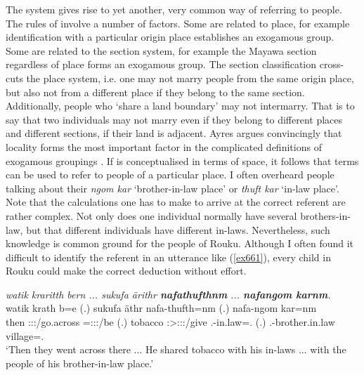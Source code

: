 The  system gives rise to yet another, very common way of referring to people. The rules of  involve a number of factors. Some are related to place, for example identification with a particular origin place establishes an exogamous group. Some are related to the section system, for example the Mayawa section regardless of place forms an exogamous group. The section classification cross-cuts the place system, i.e. one may not marry people from the same origin place, but also not from a different place if they belong to the same section. Additionally, people who `share a land boundary' may not intermarry. That is to say that two individuals may not marry even if they belong to different places and different sections, if their land is adjacent. Ayres argues convincingly that locality forms the most important factor in the complicated definitions of exogamous groupings \citep[chapter 5]{Ayres:ws}. If  is conceptualised in terms of space, it follows that  terms can be used to refer to people of a particular place. I often overheard people talking about their \emph{ngom kar} `brother-in-law place' or \emph{thuft kar} `in-law place'. Note that the calculations one has to make to arrive at the correct referent are rather complex. Not only does one individual normally have several brothers-in-law, but that different individuals have different in-laws. Nevertheless, such knowledge is common ground for the people of Rouku. Although I often found it difficult to identify the referent in an utterance like (\ref{ex661}), every child in Rouku could make the correct deduction without effort.

\begin{exe}
	\ex \emph{watik kraritth bern ... sukufa ärithr \textbf{nafathufthnm} ... \textbf{nafangom karnm}.}\\
	\gll watik krath b=e (.) sukufa äthr nafa-thufth=nm (.) nafa-ngom kar=nm\\
	then \Stdu:\Sbj:\Irr:\Pfv/go.across \Med=\Stdu:\Sbj:\Nonpast:\Ipfv/be (.) tobacco \Stsg:\Sbj>\Stpl:\Io:\Nonpast:\Ipfv/give \Third.\Poss-{in.law}=\Dat.\Nsg{} (.) \Third.\Poss-{brother.in.law} village=\Dat.\Nsg{}\\
	\trans `Then they went across there ... He shared tobacco with his in-laws ... with the people of his brother-in-law place.'
	\label{ex661}
\end{exe}
